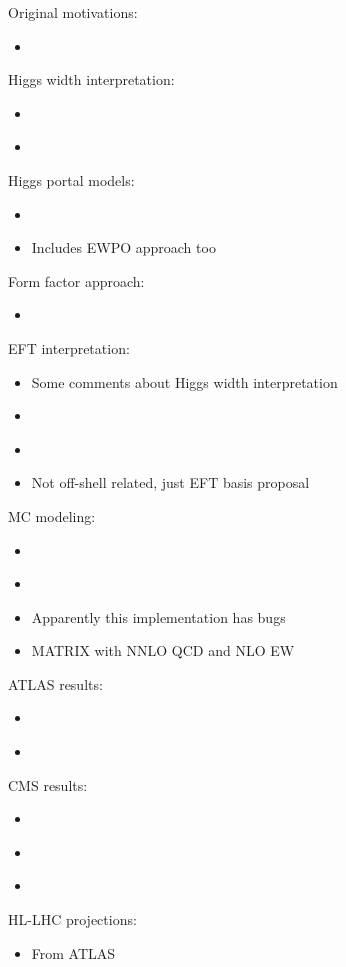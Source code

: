 \documentclass[11pt,letterpaper]{article}
\begin{document}
Original motivations:
\begin{itemize}
  \item \cite{Kauer:2012hd} 
\end{itemize}

Higgs width interpretation:
\begin{itemize}  
  \item \cite{Caola:2013yja}
  \item \cite{Campbell:2013una}
\end{itemize}

Higgs portal models:
\begin{itemize}
  \item \cite{Goncalves:2017iub} 
  \item \cite{Englert:2020gcp} Includes EWPO approach too
\end{itemize}

Form factor approach:
\begin{itemize}
  \item \cite{Goncalves:2018pkt}
\end{itemize}

EFT interpretation:
\begin{itemize}
  \item \cite{Azatov:2014jga} Some comments about Higgs width interpretation
  \item \cite{Azatov:2016xik}
  \item \cite{Contino:2016jqw}
  \item \cite{Falkowski:2001958} Not off-shell related, just EFT basis proposal
\end{itemize}

MC modeling:
\begin{itemize}
  \item \cite{Caola:2015psa}
  \item \cite{Caola:2016trd}
  \item \cite{Alioli:2016xab} Apparently this implementation has bugs
  \item \cite{Kallweit:2019zez} MATRIX with NNLO QCD and NLO EW
\end{itemize}

ATLAS results:
\begin{itemize}
  \item \cite{Aad:2015xua}
  \item \cite{Aaboud:2018puo}
\end{itemize}

CMS results:
\begin{itemize}
  \item \cite{Khachatryan:2014iha}
  \item \cite{Khachatryan:2016ctc}
  \item \cite{Sirunyan:2019twz}
\end{itemize}

HL-LHC projections:
\begin{itemize}
  \item \cite{ATL-PHYS-PUB-2015-024} From ATLAS
\end{itemize}



\end{document}
